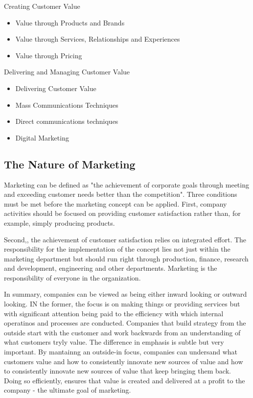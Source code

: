 \documentclass{article}
\begin{document}
Creating Customer Value
\begin{itemize}
    \item Value through Products and Brands
    \item Value through Services, Relationships and Experiences
    \item Value through Pricing
\end{itemize}

Delivering and Managing Customer Value
\begin{itemize}
    \item Delivering Customer Value
    \item Mass Communications Techniques
    \item Direct communications techniques
    \item Digital Marketing
\end{itemize}

\subsection{The Nature of Marketing}
Marketing can be defined as "the achievement of corporate goals through meeting and exceeding customer needs better than the competition". Three conditions must be met before the marketing concept can be applied. First, company activities should be focused on providing customer satisfaction rather than, for example, simply producing products. 

Second,, the achievement of customer satisfaction relies on integrated effort. The responsibility for the implementation of the concept lies not just within the marketing department but should run right through production, finance, research and development, engineering and other departments. Marketing is the responsibility of everyone in the organization.

In summary, companies can be viewed as being either inward looking or outward looking. IN the former, the focus is on making things or providing services  but with significant attention being paid to the efficiency with which internal operatinos and processes are conducted. Companies that build strategy from the outside start with the customer and work backwards from an understanding of what customers tryly value. The difference in emphasis is subtle but very important. By mantainng an outside-in focus, companies can undersand what customers value and how to consistently innovate new sources of value and how to consistently innovate new sources of value that keep bringing them back. Doing so efficiently, ensures that value is created and delivered at a profit to the company - the ultimate goal of marketing. 
\end{document}

